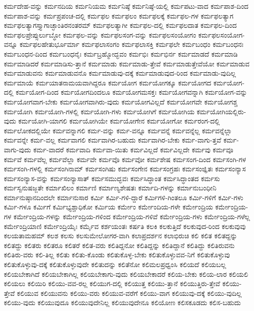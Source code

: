{ಕರ್ಮದೇಹ-ವನ್ನು
ಕರ್ಮನದಿಯ
ಕರ್ಮನಿಯಮ
ಕರ್ಮನಿಷ್ಠೆ
ಕರ್ಮನಿಷ್ಠೆ-ಯಲ್ಲಿ
ಕರ್ಮಪಟು-ವಾದ
ಕರ್ಮಪಾಶ-ದಿಂದ
ಕರ್ಮಪಾಶ-ವನ್ನು
ಕರ್ಮಪ್ರಪಂಚ-ದಲ್ಲಿ
ಕರ್ಮಫಲ
ಕರ್ಮಫಲಂ
ಕರ್ಮಫಲಕ್ಕೆ
ಕರ್ಮಫಲ-ಗಳ
ಕರ್ಮಫಲತ್ಯಾಗ
ಕರ್ಮಫಲತ್ಯಾಗಸ್ತ್ಯಾಗಾಚ್ಛಾಂತಿರನಂತರಮ್
ಕರ್ಮಫಲತ್ಯಾಗೀ
ಕರ್ಮಫಲ-ದಲ್ಲಿ
ಕರ್ಮಫಲದಾತ
ಕರ್ಮಫಲ-ದಿಂದ
ಕರ್ಮಫಲಪ್ರೇಪ್ಸುರ್ಲುಬ್ಧೋ
ಕರ್ಮಫಲ-ವನ್ನು
ಕರ್ಮಫಲಸಂಗ-ವನ್ನು
ಕರ್ಮಫಲಸಂಯೋಗಂ
ಕರ್ಮಫಲಸಂಯೋಗ-ವನ್ನೂ
ಕರ್ಮಫಲಹೇತುರ್ಭೂರ್ಮಾ
ಕರ್ಮಫಲಾಸಂಗಂ
ಕರ್ಮಫಲಾಸಕ್ತಿ
ಕರ್ಮಫಲೇ
ಕರ್ಮಬಂಧಂ
ಕರ್ಮಬಂಧನಃ
ಕರ್ಮಬಂಧನ-ದಿಂದ
ಕರ್ಮಬಂಧನೈಃ
ಕರ್ಮಬ್ರಹ್ಮೋದ್ಭವಂ
ಕರ್ಮಭಿಃ
ಕರ್ಮಭಿರ್ನ
ಕರ್ಮಮಾಡದೆ
ಕರ್ಮಮಾಡಿ
ಕರ್ಮಮಾಡಿದರೆ
ಕರ್ಮಮಾಡಿಸು-ತ್ತಾನೆ
ಕರ್ಮಮಾಡು
ಕರ್ಮಮಾಡು-ತ್ತೇವೆ
ಕರ್ಮಮಾಡುತ್ತೇವೆಯೋ
ಕರ್ಮಮಾಡುವ
ಕರ್ಮಮಾಡುವನು
ಕರ್ಮಮಾಡುವನೊ
ಕರ್ಮಮಾಡುವು-ದಕ್ಕೆ
ಕರ್ಮಮಾಡುವುದ-ರಿಂದ
ಕರ್ಮಮಾಡು-ವುದಿಲ್ಲ
ಕರ್ಮಮಾಯೆ
ಕರ್ಮಯಾತನಾಮಯವಾಗಿದ್ದರೂ
ಕರ್ಮಯೋಗ
ಕರ್ಮಯೋಗಕ್ಕೂ
ಕರ್ಮಯೋಗದ
ಕರ್ಮಯೋಗ-ದಲ್ಲಿ
ಕರ್ಮಯೋಗ-ದಿಂದ
ಕರ್ಮಯೋಗದಿಂದಲೂ
ಕರ್ಮಯೋಗಮಸಕ್ತಃ
ಕರ್ಮಯೋಗವನ್ನಾಗಿ
ಕರ್ಮಯೋಗ-ವನ್ನು
ಕರ್ಮಯೋಗವಾಗ-ಬೇಕು
ಕರ್ಮಯೋಗವಾಗಿರು-ವುದು
ಕರ್ಮಯೋಗವಿಲ್ಲದೆ
ಕರ್ಮಯೋಗವೇ
ಕರ್ಮಯೋಗಶ್ಚ
ಕರ್ಮಯೋಗಿ
ಕರ್ಮಯೋಗಿ-ಗಳಲ್ಲಿ
ಕರ್ಮಯೋಗಿ-ಗಳು
ಕರ್ಮಯೋಗಿಗೆ
ಕರ್ಮಯೋಗಿಯ
ಕರ್ಮಯೋಗಿಯಲ್ಲಿರು-ವುದು
ಕರ್ಮಯೋಗಿ-ಯಾಗಲಿ
ಕರ್ಮಯೋಗಿಯೇ
ಕರ್ಮಯೋಗೇನ
ಕರ್ಮಯೋಗೋ
ಕರ್ಮರಂಗ-ದಲ್ಲಿ
ಕರ್ಮಲೋಕದಲ್ಲಿಯೇ
ಕರ್ಮವನ್ನಾಗಲಿ
ಕರ್ಮ-ವನ್ನು
ಕರ್ಮ-ವನ್ನೂ
ಕರ್ಮವನ್ನೆ
ಕರ್ಮವನ್ನೆಲ್ಲ
ಕರ್ಮವನ್ನೆಲ್ಲಾ
ಕರ್ಮವನ್ನೇ
ಕರ್ಮ-ವಲ್ಲ
ಕರ್ಮವಾಗಲಿ
ಕರ್ಮವಾಗಿರ-ಬಹುದು
ಕರ್ಮವಾಗಿರ-ಬೇಕು
ಕರ್ಮ-ವಾಗು-ತ್ತವೆ
ಕರ್ಮ-ವಾಗು-ವುದು
ಕರ್ಮ-ವಾದರೆ
ಕರ್ಮವಾದಿ
ಕರ್ಮವಾ-ಯಿತು
ಕರ್ಮವಿಲ್ಲದೆ
ಕರ್ಮವಿಲ್ಲದೇ
ಕರ್ಮವು
ಕರ್ಮವೂ
ಕರ್ಮವೆ
ಕರ್ಮವೆಲ್ಲ
ಕರ್ಮವೆಲ್ಲಾ
ಕರ್ಮವೇ
ಕರ್ಮವೊ
ಕರ್ಮವೋ
ಕರ್ಮಶೇಷ
ಕರ್ಮಸಂಗ-ದಿಂದ
ಕರ್ಮಸಂಗಿ-ಗಳ
ಕರ್ಮಸಂಗಿ-ಗಳಲ್ಲಿ
ಕರ್ಮಸಂಗಿನಾಮ್
ಕರ್ಮಸಂಗಿಷು
ಕರ್ಮಸಂಗೇನ
ಕರ್ಮಸಂಗ್ರಹಃ
ಕರ್ಮಸಂಜ್ಞಿತಃ
ಕರ್ಮಸಂನ್ಯಾಸ
ಕರ್ಮಸಂನ್ಯಾಸ-ವನ್ನು
ಕರ್ಮಸಂನ್ಯಾಸಾತ್
ಕರ್ಮಸಮುದ್ಭವಃ
ಕರ್ಮಸಿದ್ಧಾಂತ
ಕರ್ಮಸಿದ್ಧಾಂತದ
ಕರ್ಮಸು
ಕರ್ಮಸ್ವನುಷಜ್ಜತೇ
ಕರ್ಮಾಖಿಲಂ
ಕರ್ಮಾಣಿ
ಕರ್ಮಾಣ್ಯಶೇಷತಃ
ಕರ್ಮಾದಿ-ಗಳನ್ನು
ಕರ್ಮಾನುಬಂಧೀನಿ
ಕರ್ಮಾನುಷ್ಠಾನದಿಂದಲೇ
ಕರ್ಮಾನುಸಾರ
ಕರ್ಮಿ
ಕರ್ಮಿ-ಗಳಿ-ದ್ದಾರೆ
ಕರ್ಮಿಗಳಿ-ಗಿಂತಲೂ
ಕರ್ಮಿ-ಗಳಿಗೆ
ಕರ್ಮಿ-ಗಳು
ಕರ್ಮಿ-ಗಳೂ
ಕರ್ಮಿಗೆ
ಕರ್ಮಿಭ್ಯಶ್ಚಾಧಿಕೋ
ಕರ್ಮಿಯ
ಕರ್ಮೇಂ
ಕರ್ಮೇಂದಿಯ-ಗಳೇ
ಕರ್ಮೇಂದ್ರಿಯ
ಕರ್ಮೇಂದ್ರಿಯ-ಗಳ
ಕರ್ಮೇಂದ್ರಿಯ-ಗಳನ್ನು
ಕರ್ಮೇಂದ್ರಿಯ-ಗಳಿಂದ
ಕರ್ಮೇಂದ್ರಿಯ-ಗಳಿವೆ
ಕರ್ಮೇಂದ್ರಿಯ-ಗಳು
ಕರ್ಮೇಂದ್ರಿಯ-ಗಳೆಲ್ಲ
ಕರ್ಮೇಂದ್ರಿಯಾಣಿ
ಕರ್ಮೇಂದ್ರಿಯೈಃ
ಕರ್ಮೈವ
ಕರ್ಶಯಂತಃ
ಕರ್ಷತಿ
ಕಲಕಿ
ಕಲಕುತ್ತಿದೆ
ಕಲಕುವುದ-ರಿಂದ
ಕಲಕುವುವು
ಕಲಯತಾಮಹಮ್
ಕಲಶ
ಕಲಸು
ಕಲಸುಮೇಲೋಗರ-ವಾಗಿ
ಕಲಾಪ್ರದರ್ಶನ
ಕಲಾಭಿರುಚಿ
ಕಲಿ
ಕಲಿತ
ಕಲಿತದ್ದನ್ನು
ಕಲಿತದ್ದು
ಕಲಿತರು
ಕಲಿತರೂ
ಕಲಿತರೆ
ಕಲಿತ-ವರು
ಕಲಿತಿದ್ದನೋ
ಕಲಿತಿದ್ದನ್ನು
ಕಲಿತಿದ್ದಾನೆ
ಕಲಿತಿದ್ದು
ಕಲಿತಿರುವನು
ಕಲಿತಿರು-ವರು
ಕಲಿ-ತಿಲ್ಲ
ಕಲಿತು
ಕಲಿತು-ಕೊಂಡು
ಕಲಿತುಕೊಳ್ಳ-ಬೇಕು
ಕಲಿತುಕೊಳ್ಳುವವ-ನಿಗೆ
ಕಲಿತುಕೊಳ್ಳುವು
ಕಲಿತುಕೊಳ್ಳುವು-ದಕ್ಕೆ
ಕಲಿತುಕೊಳ್ಳುವುದೇ
ಕಲಿತುದನ್ನು
ಕಲಿತೆನೋ
ಕಲಿಮಲಪ್ರಧ್ವಂಸಿ
ಕಲಿಯದೆ
ಕಲಿಯಬಲ್ಲ
ಕಲಿಯಬೇಕಾಗಿದೆ
ಕಲಿಯಬೇಕಾಗಿಲ್ಲ
ಕಲಿಯಬೇಕಾಗು-ವುದು
ಕಲಿಯಬೇಕಾದರೆ
ಕಲಿಯ-ಬೇಕು
ಕಲಿಯ-ಲಾರ
ಕಲಿಯಲಿ
ಕಲಿಯಲು
ಕಲಿಯಿರಿ
ಕಲಿಯು-ವವ-ರಲ್ಲ
ಕಲಿಯುಗ-ದಲ್ಲಿ
ಕಲಿಯುತ್ತ
ಕಲಿಯು-ತ್ತಾನೆ
ಕಲಿಯುತ್ತಿರು-ತ್ತೇವೆ
ಕಲಿಯು-ತ್ತೇವೆ
ಕಲಿಯುವ
ಕಲಿಯುವನು
ಕಲಿಯು-ವರು
ಕಲಿಯುವ-ವರೆಗೆ
ಕಲಿಯು-ವಾಗ
ಕಲಿಯುವು-ದಕ್ಕೆ
ಕಲಿಯು-ವುದಿಲ್ಲ
ಕಲಿಯು-ವುದು
ಕಲಿಯುವುದೂ
ಕಲಿಯುವುದೇನಿಲ್ಲ
ಕಲಿಯುವುದೇನೂ
ಕಲಿಯೋಣ
ಕಲಿಸಕೂಡದು
ಕಲಿಸ-ಬಹುದು
}

